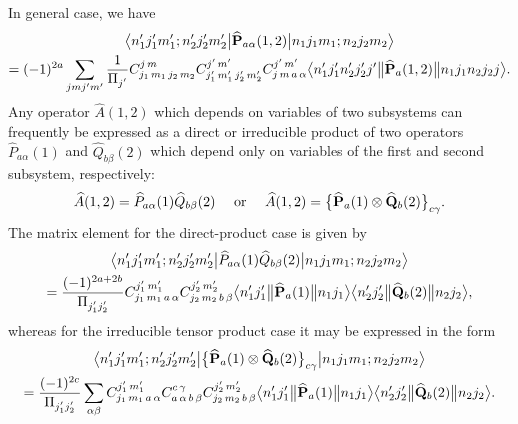 In general case, we have
\begin{multline}
\braOket{ n_{1}^{\prime} j_{1}^{\prime} m_{1}^{\prime} ; n_{2}^{\prime} j_{2}^{\prime} m_{2}^{\prime}}{ \widehat{\vect{P}}_{a \alpha}(1,2)}{n_{1} j_{1} m_{1} ; n_{2} j_{2} m_{2}} \\
=(-1)^{2 a} \sum_{j m j^{\prime} m^{\prime}} \frac{1}{\Fact{j^{\prime}}} 
\clebsch{j_{1}}{m_{1}}{j_{2}}{m_{2}}{j}{m} 
\clebsch{j_{1}^{\prime}}{m_{1}^{\prime}}{j_{2}^{\prime}}{m_{2}^{\prime}}{j^{\prime}}{m^{\prime}} 
\clebsch{j}{m}{a}{\alpha}{j^{\prime}}{m^{\prime}}
\braOketred{ n_{1}^{\prime} j_{1}^{\prime} n_{2}^{\prime} j_{2}^{\prime} j^{\prime}}{\widehat{\vect{P}}_{a}(1,2)}{ n_{1} j_{1} n_{2} j_{2} j}. \label{eq:13:1:23}
\end{multline}
Any operator \(\widehat{A}(1,2)\) which depends on variables of two subsystems can frequently be expressed as a direct or irreducible product of two operators \(\widehat{P}_{a \alpha}(1)\) and \(\widehat{Q}_{b \beta}(2)\) which depend only on variables of the first and second subsystem, respectively:
\begin{equation*}
\widehat{A}(1,2)=\widehat{P}_{a \alpha}(1) \widehat{Q}_{b \beta}(2) \quad \text { or } \quad \widehat{A}(1,2)=\bigl\{\widehat{\mathbf{P}}_{a}(1) \otimes \widehat{\mathbf{Q}}_{b}(2)\bigr\}_{c \gamma}.
\end{equation*}
The matrix element for the direct-product case is given by
\begin{multline}
\braOket{ n_{1}^{\prime} j_{1}^{\prime} m_{1}^{\prime} ; n_{2}^{\prime} j_{2}^{\prime} m_{2}^{\prime}}{ \widehat{P}_{a \alpha}(1)  \widehat{Q}_{b \beta}(2)}{n_{1} j_{1} m_{1} ; n_{2} j_{2} m_{2}} \\
=\frac{(-1)^{2 a+2 b}}{\Fact{j_{1}^{\prime} j_{2}^{\prime}}} 
\clebsch{j_{1}}{m_{1}}{a}{\alpha}{j_{1}^{\prime}}{m_{1}^{\prime}} 
\clebsch{j_{2}}{m_{2}}{b}{\beta}{j_{2}^\prime}{m_{2}^{\prime}}
\braOketred{ n_{1}^{\prime} j_{1}^{\prime}}{\widehat{\vect{P}}_{a}(1)}{ n_{1} j_{1}}
\braOketred{n_{2}^{\prime} j_{2}^{\prime}}{\widehat{\vect{Q}}_{b}(2)}{n_{2} j_{2}}, \label{eq:13:1:24}
\end{multline}
whereas for the irreducible tensor product case it may be expressed in the form
\begin{multline}
\braOket{ n_{1}^{\prime} j_{1}^{\prime} m_{1}^{\prime} ; n_{2}^{\prime} j_{2}^{\prime} m_{2}^{\prime}}{\bigl\{\widehat{\vect{P}}_{a}(1) \otimes \widehat{\vect{Q}}_{b}(2)\bigr\}_{c \gamma}}{n_{1} j_{1} m_{1} ; n_{2} j_{2} m_{2}} \\
=\frac{(-1)^{2 c}}{\Fact{j_{1}^{\prime} j_{2}^{\prime}}} 
\sum_{\alpha \beta} 
\clebsch{j_{1}}{m_{1}}{a}{\alpha}{j_{1}^{\prime}}{m_{1}^{\prime}} 
\clebsch{a}{\alpha}{b}{\beta}{c}{\gamma} 
\clebsch{j_{2}}{m_{2}}{b}{\beta}{j_{2}^{\prime}}{m_{2}^{\prime}}
\braOketred{ n_{1}^{\prime} j_{1}^{\prime}}{\widehat{\vect{P}}_{a}(1)}{ n_{1} j_{1}}
\braOketred{ n_{2}^{\prime} j_{2}^{\prime}}{\widehat{\vect{Q}}_{b}(2)}{ n_{2} j_{2}}. \label{eq:13:1:25}
\end{multline}
